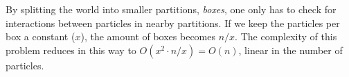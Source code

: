 By splitting the world into smaller partitions, \emph{boxes}, one only has to 
check for interactions between particles in nearby partitions. If we keep the 
particles per box a constant ($x$), the amount of boxes becomes $n/x$. The 
complexity of this problem reduces in this way to $O(x^2 \cdot n/x) = O(n)$, 
linear in the number of particles.
